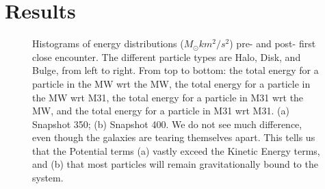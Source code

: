 \documentclass[linenumbers, ]{aastex631}
\begin{document}
\section{Results}

\begin{figure}[ht!]
\centering
      
      
\caption{\label{fig:potentialdists} Histograms of energy distributions ($M_\odot km^2/s^2$) pre- and post- first close encounter. The different particle types are Halo, Disk, and Bulge, from left to right. From top to bottom: the total energy for a particle in the MW wrt the MW, the total energy for a particle in the MW wrt M31, the total energy for a particle in M31 wrt the MW, and the total energy for a particle in M31 wrt M31. (a) Snapshot 350; (b) Snapshot 400. We do not see much difference, even though the galaxies are tearing themselves apart. This tells us that the Potential terms (a) vastly exceed the Kinetic Energy terms, and (b) that most particles will remain gravitationally bound to the system.}
\end{figure}
\end{document}
